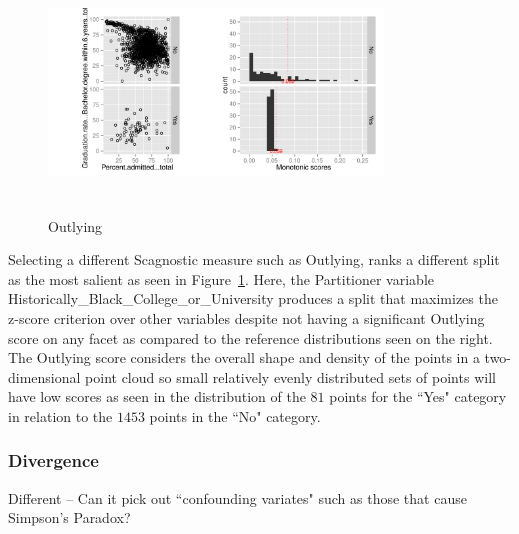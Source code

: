 \begin{figure}
\includegraphics[width=3.5in,height=2.5in]{images/10_3880027387531-Historically_Black_College_or_University.pdf}
  \caption{Outlying}
 \label{fig:outlying1}
\end{figure}

Selecting a different Scagnostic measure such as Outlying, ranks a different split as the most salient as seen in Figure~\ref{fig:outlying1}. Here, the Partitioner variable Historically\_Black\_College\_or\_University produces a split that maximizes the z-score criterion over other variables despite not having a significant Outlying score on any facet as compared to the reference distributions seen on the right. The Outlying score considers the overall shape and density of the points in a two-dimensional point cloud so small relatively evenly distributed sets of points will have low scores as seen in the distribution of the $81$ points for the ``Yes" category in relation to the $1453$ points in the ``No" category.

\subsubsection{Divergence}
Different -- Can it pick out ``confounding variates" such as those that cause Simpson's Paradox?

